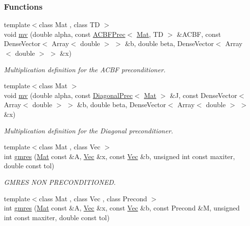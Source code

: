 \subsubsection*{Functions}
\begin{CompactItemize}
\item 
{\footnotesize template$<$class Mat , class TD $>$ }\\void \hyperlink{namespaceflens_981e54f9a00c100ae67795a084157991}{mv} (double alpha, const \hyperlink{classflens_1_1ACBFPrec}{ACBFPrec}$<$ \hyperlink{Traits_8hpp_b349a67c16cc4a221c94f5bb1fa77da5}{Mat}, TD $>$ \&ACBF, const DenseVector$<$ Array$<$ double $>$ $>$ \&b, double beta, DenseVector$<$ Array$<$ double $>$ $>$ \&x)
\begin{CompactList}\small\item\em Multiplication definition for the ACBF preconditioner. \item\end{CompactList}\item 
{\footnotesize template$<$class Mat $>$ }\\void \hyperlink{namespaceflens_dcd31328a4165977fc58d8caf75f4b73}{mv} (double alpha, const \hyperlink{classflens_1_1DiagonalPrec}{DiagonalPrec}$<$ \hyperlink{Traits_8hpp_b349a67c16cc4a221c94f5bb1fa77da5}{Mat} $>$ \&J, const DenseVector$<$ Array$<$ double $>$ $>$ \&b, double beta, DenseVector$<$ Array$<$ double $>$ $>$ \&x)
\begin{CompactList}\small\item\em Multiplication definition for the Diagonal preconditioner. \item\end{CompactList}\item 
{\footnotesize template$<$class Mat , class Vec $>$ }\\int \hyperlink{namespaceflens_b42c85e91ab78586f4d7d5940b53c620}{gmres} (\hyperlink{Traits_8hpp_b349a67c16cc4a221c94f5bb1fa77da5}{Mat} const \&A, \hyperlink{Traits_8hpp_327b06345fe9c9ae56c556c92b78272b}{Vec} \&x, const \hyperlink{Traits_8hpp_327b06345fe9c9ae56c556c92b78272b}{Vec} \&b, unsigned int const maxiter, double const tol)
\begin{CompactList}\small\item\em GMRES NON PRECONDITIONED. \item\end{CompactList}\item 
{\footnotesize template$<$class Mat , class Vec , class Precond $>$ }\\int \hyperlink{namespaceflens_33e1ebd5957027ca909b9738ee6f2054}{gmres} (\hyperlink{Traits_8hpp_b349a67c16cc4a221c94f5bb1fa77da5}{Mat} const \&A, \hyperlink{Traits_8hpp_327b06345fe9c9ae56c556c92b78272b}{Vec} \&x, const \hyperlink{Traits_8hpp_327b06345fe9c9ae56c556c92b78272b}{Vec} \&b, const Precond \&M, unsigned int const maxiter, double const tol)

\end{CompactItemize}
